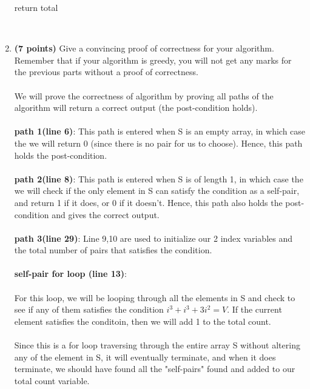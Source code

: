 \documentclass{assignment-373}
\begin{document}
\begin{enumerate}
\begin{python}
    return total
    \end{python}
    \\
\item \textbf{(7 points)} Give a convincing proof of correctness for
  your algorithm. Remember that if your algorithm is greedy, you will
  not get any marks for the previous parts without a proof of correctness.\\
  \textrm{\\
  We will prove the correctness of algorithm by proving all paths of the algorithm will return a correct output (the post-condition holds).\\
  \\
  \phantom{=} \phantom{=} {\bf path 1(line 6)}: This path is entered when S is an empty array, in which case the we will return 0 (since there is no pair for us to choose). Hence, this path holds the post-condition.\\
  \\
  \phantom{=} \phantom{=} {\bf path 2(line 8)}: This path is entered when S is of length 1, in which case the we will check if the only element in S can satisfy the condition as a self-pair, and return 1 if it does, or 0 if it doesn't. Hence, this path also holds the post-condition and gives the correct output.\\
  \\
  \phantom{=} \phantom{=} {\bf path 3(line 29)}: Line 9,10 are used to initialize our 2 index variables and the total number of pairs that satisfies the condition.\\
  \\
  \phantom{=} \phantom{=} \phantom{=} \phantom{=} {\bf self-pair for loop (line 13)}: \\
  \\
  \phantom{=} \phantom{=} \phantom{=} \phantom{=} \phantom{=} \phantom{=} For this loop, we will be looping through all the elements in S and check to see if any of them satisfies the condition $i^3 + i^3 + 3i^2 = V$. If the current element satisfies the conditoin, then we will add 1 to the total count.\\
  \\
  \phantom{=} \phantom{=} \phantom{=} \phantom{=} \phantom{=} \phantom{=} Since this is a for loop traversing through the entire array S without altering any of the element in S, it will eventually terminate, and when it does terminate, we should have found all the "self-pairs" found and added to our total count variable.\\
  \\
}
\end{enumerate}
\end{document}

